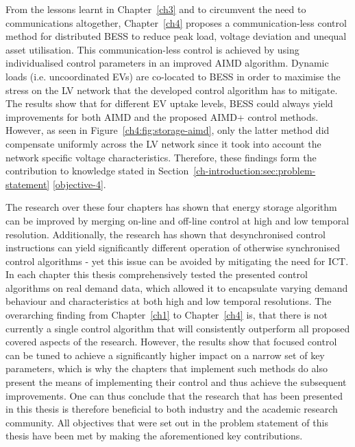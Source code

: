 From the lessons learnt in Chapter~\ref{ch3} and to circumvent the need to communications altogether, Chapter~\ref{ch4} proposes a communication-less control method for distributed BESS to reduce peak load, voltage deviation and unequal asset utilisation.
This communication-less control is achieved by using individualised control parameters in an improved AIMD algorithm.
Dynamic loads (i.e. uncoordinated EVs) are co-located to BESS in order to maximise the stress on the LV network that the developed control algorithm has to mitigate.
The results show that for different EV uptake levels, BESS could always yield improvements for both AIMD and the proposed AIMD+ control methods.
However, as seen in Figure~\ref{ch4:fig:storage-aimd}, only the latter method did compensate uniformly across the LV network since it took into account the network specific voltage characteristics.
Therefore, these findings form the contribution to knowledge stated in Section~\ref{ch-introduction:sec:problem-statement} \ref{objective-4}.

The research over these four chapters has shown that energy storage algorithm can be improved by merging on-line and off-line control at high and low temporal resolution.
Additionally, the research has shown that desynchronised control instructions can yield significantly different operation of otherwise synchronised control algorithms - yet this issue can be avoided by mitigating the need for ICT.
In each chapter this thesis comprehensively tested the presented control algorithms on real demand data, which allowed it to encapsulate varying demand behaviour and characteristics at both high and low temporal resolutions.
The overarching finding from Chapter~\ref{ch1} to Chapter~\ref{ch4} is, that there is not currently a single control algorithm that will consistently outperform all proposed covered aspects of the research.
However, the results show that focused control can be tuned to achieve a significantly higher impact on a narrow set of key parameters, which is why the chapters that implement such methods do also present the means of implementing their control and thus achieve the subsequent improvements.
One can thus conclude that the research that has been presented in this thesis is therefore beneficial to both industry and the academic research community.
All objectives that were set out in the problem statement of this thesis have been met by making the aforementioned key contributions.

